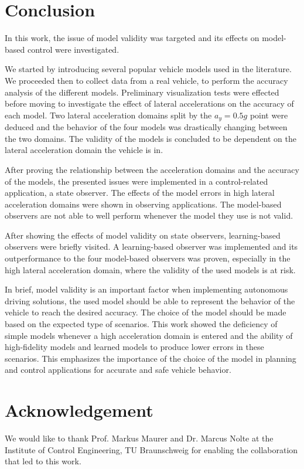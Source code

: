 \documentclass[journal]{IEEEtran}
\begin{document}
\section{Conclusion}\label{conclusion.sec}
In this work, the issue of model validity was targeted and its effects on model-based control were investigated. 

We started by introducing several popular vehicle models used in the literature. We proceeded then to collect data from a real vehicle, to perform the accuracy analysis of the different models. Preliminary visualization tests were effected before moving to investigate the effect of lateral accelerations on the accuracy of each model. Two lateral acceleration domains split by the $a_y = 0.5g$ point were deduced and the behavior of the four models was drastically changing between the two domains. The validity of the models is concluded to be dependent on the lateral acceleration domain the vehicle is in. 

After proving the relationship between the acceleration domains and the accuracy of the models, the presented issues were implemented in a control-related application, a state observer. The effects of the model errors in high lateral acceleration domains were shown in observing applications. The model-based observers are not able to well perform whenever the model they use is not valid. 

After showing the effects of model validity on state observers, learning-based observers were briefly visited. A learning-based observer was implemented and its outperformance to the four model-based observers was proven, especially in the high lateral acceleration domain, where the validity of the used models is at risk. 

In brief, model validity is an important factor when implementing autonomous driving solutions, the used model should be able to represent the behavior of the vehicle to reach the desired accuracy. The choice of the model should be made based on the expected type of scenarios. This work showed the deficiency of simple models whenever a high acceleration domain is entered and the ability of high-fidelity models and learned models to produce lower errors in these scenarios. This emphasizes the importance of the choice of the model in planning and control applications for accurate and safe vehicle behavior.  

\section*{Acknowledgement}
We would like to thank Prof. Markus Maurer and Dr. Marcus Nolte at the Institute of Control Engineering, TU Braunschweig for enabling the collaboration that led to this work. 





\end{document}
